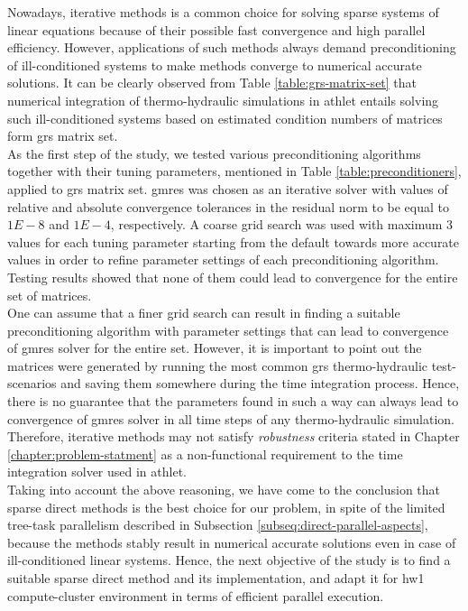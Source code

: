 \label{subseq:hybrid-method-description}

Nowadays, iterative methods is a common choice for solving sparse systems of linear equations because of their possible fast convergence and high parallel efficiency. However,  applications of such methods always demand preconditioning of ill-conditioned systems to make methods converge to numerical accurate solutions. It can be clearly observed from Table \ref{table:grs-matrix-set} that numerical integration of thermo-hydraulic simulations in \acrshort{athlet} entails solving such ill-conditioned systems  based on estimated condition numbers of matrices form \acrshort{grs} matrix set.\\


As the first step of the study, we tested various preconditioning algorithms together with their tuning parameters, mentioned in Table \ref{table:preconditioners}, applied to \acrshort{grs} matrix set. \acrshort{gmres} was chosen as an iterative solver with values of relative and absolute convergence tolerances in the residual norm to be equal to $1E-8$ and $1E-4$, respectively. A coarse grid search was used with maximum 3 values for each tuning parameter starting from the default towards more accurate values in order to refine parameter settings of each preconditioning algorithm. Testing results showed that none of them could lead to convergence for the entire set of matrices.\\


One can assume that a finer grid search can result in finding a suitable preconditioning algorithm with parameter  settings that can lead to convergence of \acrshort{gmres} solver for the entire set. However, it is important to point out the matrices were generated by running the most common \acrshort{grs} thermo-hydraulic test-scenarios and saving them somewhere during the time integration process. Hence, there is no guarantee that the parameters found in such a way can always lead to convergence of \acrshort{gmres} solver in all time steps of any thermo-hydraulic simulation. Therefore, iterative methods may not satisfy \textit{robustness} criteria stated in Chapter \ref{chapter:problem-statment} as a non-functional requirement to the time integration solver used in \acrshort{athlet}.\\


Taking into account the above reasoning, we have come to the conclusion that sparse direct methods is the best choice for our problem, in spite of the limited tree-task parallelism described in Subsection \ref{subseq:direct-parallel-aspects}, because the methods stably result in numerical accurate solutions even in case of ill-conditioned linear systems. Hence, the next objective of the study is to find a suitable sparse direct method and its implementation, and adapt it for \gls{hw1} compute-cluster environment in terms of efficient parallel execution. \\
